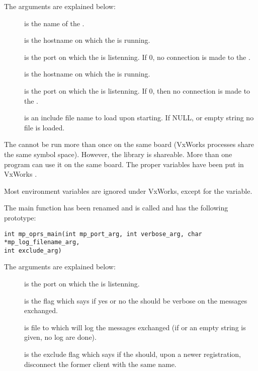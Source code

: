 The arguments are explained below:

\begin{description}

\item[] is the name of the \CPK{}.

\item[] is the hostname on which the \OPRSS{} is running.

\item[] is the port on which the \OPRSS{} is listenning.
If 0, no connection is made to the \OPRSS{}.

\item[] is the hostname on which the \MP{} is running.

\item[] is the port on which the \MP{} is listenning. If 0,
then no connection is made to the \MP{}.

\item[] is an include file name to load upon
starting. If NULL, or empty string no file is loaded.

\end{description}

The \CPK{} cannot be run more than once on the same board (VxWorks processes
share the same symbol space). However, the  library is
shareable. More than one program can use it on the same board. The proper
variables have been put in VxWorks .

Most environment variables are ignored under VxWorks, except for the
 variable.

The \MP{} main function has been renamed and is called  and
has the following prototype:

\begin{verbatim}
int mp_oprs_main(int mp_port_arg, int verbose_arg, char *mp_log_filename_arg,
int exclude_arg)
\end{verbatim}

The arguments are explained below:

\begin{description}

\item[] is the port on which the \MP{} is listenning. 

\item[] is the flag which says if yes or no the \MP{} should
be verbose on the messages exchanged.

\item[] is file to which \MP{} will log the messages
exchanged (if  or an empty string is given, no log are done).

\item[] is the exclude flag which says if the \MP{}
should, upon a newer registration, disconnect the former client with the same
name.

\end{description}


